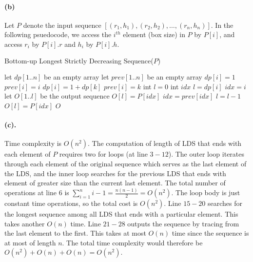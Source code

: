 \documentclass[12pt]{article}
\begin{document}
\paragraph{(b)} Let \(P\) denote the input sequence \([(r_1,h_1), (r_2,h_2), \hdots, (r_n,h_n)]\). In the following psuedocode, we access the \(i^{th}\) element (box size) in \(P\) by \(P[i]\), and access \(r_i\) by \(P[i].r\) and  \(h_i\) by \(P[i].h\).
\begin{algorithm}[H]
     \caption{Bottom-up Longest Strictly Decreasing Sequence(\(P\))}
     \begin{algorithmic}[1]
     \State let \(dp[1..n]\) be an empty array 
     \State let \(prev[1..n]\) be an empty array 
          \State \(dp[i] = 1\)
          \State \(prev[i] = i\)
                    \State \(dp[i] = 1 + dp[k]\)
                    \State \(prev[i] = k\)
               \EndIf
          \EndFor
     \EndFor
     \State int \(l = 0\)
     \State int \(idx\) 
               \State \(l = dp[i]\) 
               \State \(idx = i\) 
          \EndIf
     \EndFor
     \State let \(O[1..l]\) be the output sequence
          \State \(O[l] = P[idx]\)
          \State \(idx = prev[idx]\)
          \State \(l = l - 1\)
     \EndWhile
     \State \(O[l] = P[idx]\)
     \State \Return \(O\)
     \end{algorithmic}
\end{algorithm}

\paragraph{(c).} Time complexity is \(O(n^2)\). The computation of length of LDS that ends with each element of \(P\) requires two for loops (at line \(3-12\)). The outer loop iterates through each element of the original sequence which serves as the last element of the LDS, and the inner loop searches for the previous LDS that ends with element of greater size than the current last element. The total number of operations at line \(6\) is \(\sum_{i=1}^n i-1 = \frac{n(n-1)}{2} = O(n^2)\). The loop body is just constant time operations, so the total cost is \(O(n^2)\). Line \(15-20\) searches for the longest sequence among all LDS that ends with a particular element. This takes another \(O(n)\) time. Line \(21-28\) outputs the sequence by tracing from the last element to the first. This takes at most \(O(n)\) time since the sequence is at most of length \(n\). The total time complexity would therefore be \(O(n^2) + O(n) + O(n) = O(n^2)\).
\end{document}
